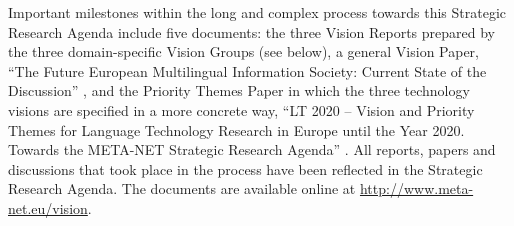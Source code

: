 \documentclass[10pt, plain]{../../metanetpaper}
\begin{document}
Important milestones within the long and complex process towards this Strategic Research Agenda include five documents: the three Vision Reports prepared by the three domain-specific Vision Groups (see below), a general Vision Paper, ``The Future European Multilingual Information Society: Current State of the Discussion'' \cite{Meta1}, and the Priority Themes Paper in which the three technology visions are specified in a more concrete way, ``LT 2020 -- Vision and Priority Themes for Language Technology Research in Europe until the Year 2020. Towards the META-NET Strategic Research Agenda'' \cite{LT2020}. All reports, papers and discussions that took place in the process have been reflected in the Strategic Research Agenda. The documents are available online at \url{http://www.meta-net.eu/vision}.

\end{document}
